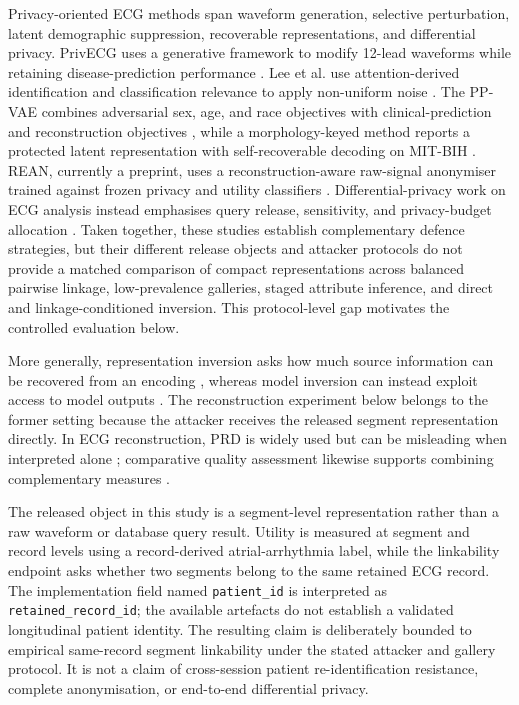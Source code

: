 \documentclass[journal]{IEEEtran}
\begin{document}
Privacy-oriented ECG methods span waveform generation, selective perturbation,
latent demographic suppression, recoverable representations, and differential
privacy. PrivECG uses a generative framework to modify 12-lead waveforms while
retaining disease-prediction performance \cite{NolinLapalme2023PrivECG}.
Lee et al. use attention-derived identification and classification relevance to
apply non-uniform noise \cite{Lee2026PrivacyECG}. The PP-VAE combines
adversarial sex, age, and race objectives with clinical-prediction and
reconstruction objectives \cite{Shishir2026PPVAE}, while a morphology-keyed
method reports a protected latent representation with self-recoverable decoding
on MIT-BIH \cite{Sumathi2026MorphologyKeyed}. REAN, currently a preprint, uses a
reconstruction-aware raw-signal anonymiser trained against frozen privacy and
utility classifiers \cite{Ki2026REAN}. Differential-privacy work on ECG analysis
instead emphasises query release, sensitivity, and privacy-budget allocation
\cite{Ghazarian2024DPReviewECG}. Taken together, these studies establish
complementary defence strategies, but their different release objects and
attacker protocols do not provide a matched comparison of compact
representations across balanced pairwise linkage, low-prevalence galleries,
staged attribute inference, and direct and linkage-conditioned inversion. This
protocol-level gap motivates the controlled evaluation below.

More generally, representation inversion asks how much source information can
be recovered from an encoding \cite{MahendranVedaldi2015RepresentationInversion},
whereas model inversion can instead exploit access to model outputs
\cite{Fredrikson2015}. The reconstruction experiment below belongs to the
former setting because the attacker receives the released segment
representation directly. In ECG reconstruction, PRD is widely used but can be
misleading when interpreted alone \cite{BlancoVelasco2005ECGPRD}; comparative
quality assessment likewise supports combining complementary measures
\cite{Nemcova2018ECGQuality}.

The released object in this study is a segment-level representation rather
than a raw waveform or database query result. Utility is measured at segment
and record levels using a record-derived atrial-arrhythmia label, while the
linkability endpoint asks whether two segments belong to the same retained ECG
record.
The implementation field named \texttt{patient\_id} is interpreted as
\texttt{retained\_record\_id}; the available artefacts do not establish a
validated longitudinal patient identity. The resulting claim is deliberately
bounded to empirical same-record segment linkability under the stated
attacker and gallery protocol. It is not a claim of cross-session patient
re-identification resistance, complete anonymisation, or end-to-end
differential privacy.
\end{document}

